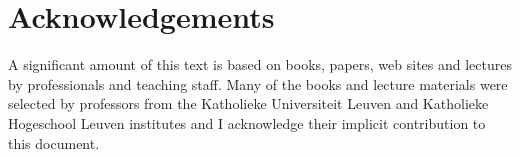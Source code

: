 \chapter*{Acknowledgements}\label{chapter:acknowledgements}

A significant amount of this text is based on books, papers, web sites and lectures by professionals and teaching staff. Many of the books and lecture materials were selected by professors from the Katholieke Universiteit Leuven and Katholieke Hogeschool Leuven institutes and I acknowledge their implicit contribution to this document.